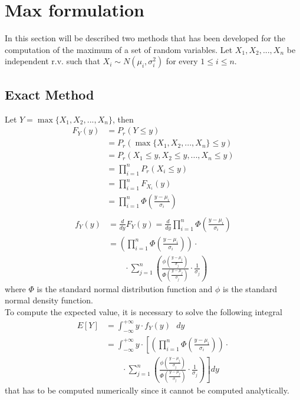 \section{Max formulation}\label{max_formulation}

In this section will be described two methods that has been developed for the computation of the maximum of a set of random variables.
Let $X_1, X_2, ..., X_n$ be independent r.v. such that $X_i \sim N(\mu_i, \sigma_i^2)$ for every $1 \leq i \leq n.$

\subsection{Exact Method}
Let $Y = \max\{X_1, X_2, ..., X_n\}$, then
\begin{align*}
	F_Y(y) &= P_r(Y \leq y) \\
	&= P_r(\max\{X_1, X_2, ..., X_n\} \leq y) \\
	&= P_r(X_1 \leq y, X_2 \leq y, ..., X_n \leq y) \\
	&= \prod_{i = 1}^n P_r(X_i \leq y)  \tag*{(by indipendence of r.v)} \\
	&= \prod_{i = 1}^n F_{X_i}(y)  \\
	&= \prod_{i = 1}^n \Phi\left(\frac{y - \mu_i}{\sigma_i}\right) \\
\end{align*}
\begin{align*}
	f_Y(y) &= \frac{d}{dy} F_Y(y) = \frac{d}{dy} \prod_{i = 1}^n \Phi\left(\frac{y - \mu_i}{\sigma_i}\right) \\
	&= \left(\prod_{i = 1}^n \Phi\left(\frac{y - \mu_i}{\sigma_i}\right)\right) \cdot \\
	&\qquad \cdot \sum_{j = 1}^n \left(\frac{\phi\left(\frac{y - \mu_j}{\sigma_j}\right)}{\Phi\left(\frac{y - \mu_j}{\sigma_j}\right)} \cdot \frac{1}{\sigma_j}\right)
\end{align*}
where $\Phi$ is the standard normal distribution function and $\phi$ is the standard normal density function. \\
To compute the expected value, it is necessary to solve the following integral
\begin{align*}
	E[Y] &= \int_{-\infty}^{+\infty} y \cdot f_Y(y)\text{ }dy \\
	&= \int_{-\infty}^{+\infty} y \cdot \left[\left(\prod_{i = 1}^n \Phi\left(\frac{y - \mu_i}{\sigma_i}\right)\right) \cdot \right. \\
	&\left. \qquad \cdot \sum_{j = 1}^n \left(\frac{\phi\left(\frac{y - \mu_j}{\sigma_j}\right)}{\Phi\left(\frac{y - \mu_j}{\sigma_j}\right)} \cdot \frac{1}{\sigma_j}\right)\right]dy
\end{align*}
that has to be computed numerically since it cannot be computed analytically.

